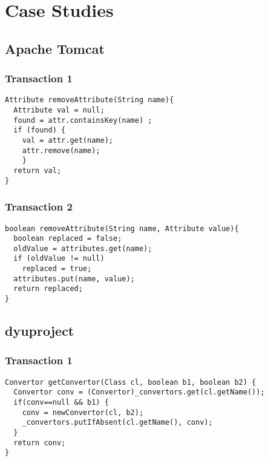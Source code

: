\section{Case Studies}
\label{appendix:casestudies}

\subsection{Apache Tomcat}

\subsubsection*{Transaction 1}
\begin{lstlisting}
Attribute removeAttribute(String name){
  Attribute val = null;
  found = attr.containsKey(name) ;
  if (found) {
    val = attr.get(name);
    attr.remove(name);
    }
  return val;
}
\end{lstlisting}

%
%
%
%

\subsubsection*{Transaction 2}
\begin{lstlisting}
boolean removeAttribute(String name, Attribute value){
  boolean replaced = false;
  oldValue = attributes.get(name);
  if (oldValue != null)
    replaced = true;
  attributes.put(name, value);
  return replaced;
}
\end{lstlisting}


%
%
%

\subsection{dyuproject}

\subsubsection*{Transaction 1}
\begin{lstlisting}
Convertor getConvertor(Class cl, boolean b1, boolean b2) {
  Convertor conv = (Convertor)_convertors.get(cl.getName());
  if(conv==null && b1) {
    conv = newConvertor(cl, b2);
    _convertors.putIfAbsent(cl.getName(), conv);
  }
  return conv;
}
\end{lstlisting}


